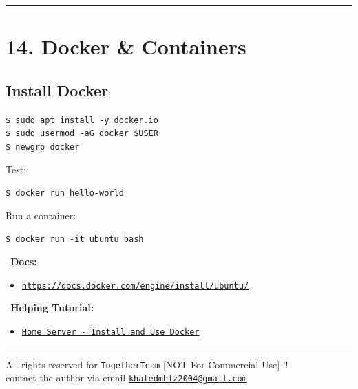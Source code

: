 \documentclass[12pt]{article}
\newcommand{\dockericon}{\faDocker}
\newcommand{\bookicon}{\faBook}
\newcommand{\computericon}{\faDesktop}
\begin{document}
\vspace{1em}
\begin{center}
\color{teamred}\rule{0.8\textwidth}{1pt}
\end{center}

\section*{14. Docker \& Containers \dockericon}

\subsection*{Install Docker}

\begin{highlightbox}
\texttt{\$ sudo apt install -y docker.io}\\
\texttt{\$ sudo usermod -aG docker \$USER}\\
\texttt{\$ newgrp docker}
\end{highlightbox}

Test:

\begin{highlightbox}
\texttt{\$ docker run hello-world}
\end{highlightbox}

Run a container:

\begin{highlightbox}
\texttt{\$ docker run -it ubuntu bash}
\end{highlightbox}

\begin{infobox}
\bookicon\ \textbf{Docs:}
\begin{itemize}
    \item \href{https://docs.docker.com/engine/install/ubuntu/}{\texttt{https://docs.docker.com/engine/install/ubuntu/}}
\end{itemize}
\end{infobox}

\begin{infobox}
\computericon\ \textbf{Helping Tutorial:}
\begin{itemize}
    \item \href{https://mmbesar.github.io/Tutorials/HS-Docker/}{\texttt{Home Server - Install and Use Docker}}
\end{itemize}
\end{infobox}

\vspace{1em}
\begin{center}
\color{teamred}\rule{0.8\textwidth}{1pt}
\end{center}

\vspace{\fill}
\begin{center}
\color{muted}
All rights reserved for \texttt{TogetherTeam} [NOT For Commercial Use] !!\\
contact the author via email \href{mailto:khaledmhfz2004@gmail.com}{\texttt{khaledmhfz2004@gmail.com}}
\end{center}
\end{document}
